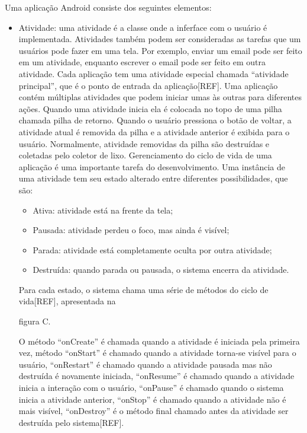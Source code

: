 Uma aplicação Android consiste dos seguintes elementos:
\begin{itemize}
    \item Atividade: uma atividade é a classe onde a inferface com o usuário é
    implementada. Atividades também podem ser consideradas as tarefas que um usuários
    pode fazer em uma tela. Por exemplo, enviar um email pode ser feito em um atividade,
    enquanto escrever o email pode ser feito em outra atividade. Cada aplicação
    tem uma atividade especial chamada “atividade principal”, que é o ponto de
    entrada da aplicação[REF]. Uma aplicação contém múltiplas atividades que
    podem iniciar umas às outras para diferentes ações. Quando uma atividade
    inicia ela é colocada no topo de uma pilha chamada pilha de retorno. Quando
    o usuário pressiona o botão de voltar, a atividade atual é removida da pilha
    e a atividade anterior é exibida para o usuário. Normalmente, atividade
    removidas da pilha são destruídas e coletadas pelo coletor de lixo.
    Gerenciamento do ciclo de vida de uma aplicação é uma importante tarefa do
    desenvolvimento. Uma instância de uma atividade tem seu estado alterado entre
    diferentes possibilidades, que são:
    \begin{itemize}
        \item Ativa: atividade está na frente da tela;
        \item Pausada: atividade perdeu o foco, mas ainda é visível;
        \item Parada: atividade está completamente oculta por outra atividade;
        \item Destruída: quando parada ou pausada, o sistema encerra da atividade.
    \end{itemize}
    Para cada estado, o sistema chama uma série de métodos do ciclo de vida[REF],
    apresentada na 
    
    figura C.  
    
    O método “onCreate” é chamada quando a atividade é
    iniciada pela primeira vez, método “onStart” é chamado quando a atividade
    torna-se visível para o usuário, “onRestart” é chamado quando a atividade
    pausada mas não destruída é novamente iniciada, “onResume” é  chamado quando
    a atividade inicia a interação com o usuário, “onPause” é chamado quando o
    sistema inicia a atividade anterior, “onStop” é chamado quando a atividade
    não é mais visível, “onDestroy” é o método final chamado antes da atividade
    ser destruída pelo sistema[REF]. 
    

\end{itemize}
